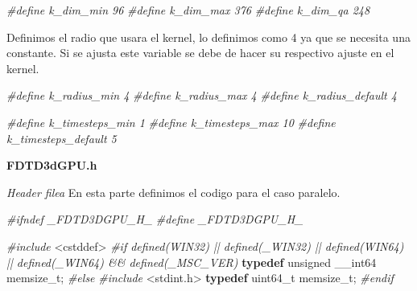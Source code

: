 \documentclass[]{article}
\newenvironment{Shaded}{\begin{snugshade}}{\end{snugshade}}
\newcommand{\KeywordTok}[1]{\textcolor[rgb]{0.13,0.29,0.53}{\textbf{{#1}}}}
\newcommand{\DataTypeTok}[1]{\textcolor[rgb]{0.13,0.29,0.53}{{#1}}}
\newcommand{\ImportTok}[1]{{#1}}
\newcommand{\PreprocessorTok}[1]{\textcolor[rgb]{0.56,0.35,0.01}{\textit{{#1}}}}
\newcommand{\NormalTok}[1]{{#1}}
\begin{document}
\begin{Shaded}
\begin{Highlighting}[]
\PreprocessorTok{#define k_dim_min           96}
\PreprocessorTok{#define k_dim_max           376}
\PreprocessorTok{#define k_dim_qa            248}
\end{Highlighting}
\end{Shaded}

Definimos el radio que usara el kernel, lo definimos como 4 ya que se
necesita una constante. Si se ajusta este variable se debe de hacer su
respectivo ajuste en el kernel.

\begin{Shaded}
\begin{Highlighting}[]
\PreprocessorTok{#define k_radius_min        4}
\PreprocessorTok{#define k_radius_max        4}
\PreprocessorTok{#define k_radius_default    4}
\end{Highlighting}
\end{Shaded}

\begin{Shaded}
\begin{Highlighting}[]
\PreprocessorTok{#define k_timesteps_min     1}
\PreprocessorTok{#define k_timesteps_max     10}
\PreprocessorTok{#define k_timesteps_default 5}
\end{Highlighting}
\end{Shaded}

\textbf{FDTD3dGPU.h}

\emph{Header filea} En esta parte definimos el codigo para el caso
paralelo.

\begin{Shaded}
\begin{Highlighting}[]
\PreprocessorTok{#ifndef _FDTD3DGPU_H_}
\PreprocessorTok{#define _FDTD3DGPU_H_}
\end{Highlighting}
\end{Shaded}

\begin{Shaded}
\begin{Highlighting}[]
\PreprocessorTok{#include }\ImportTok{<cstddef>}
\PreprocessorTok{#if defined(WIN32) || defined(_WIN32) || defined(WIN64) || defined(_WIN64) && defined(_MSC_VER)}
\KeywordTok{typedef} \DataTypeTok{unsigned} \NormalTok{__int64 }\DataTypeTok{memsize_t}\NormalTok{;}
\PreprocessorTok{#else}
\PreprocessorTok{#include }\ImportTok{<stdint.h>}
\KeywordTok{typedef} \DataTypeTok{uint64_t} \DataTypeTok{memsize_t}\NormalTok{;}
\PreprocessorTok{#endif}
\end{Highlighting}
\end{Shaded}
\end{document}
